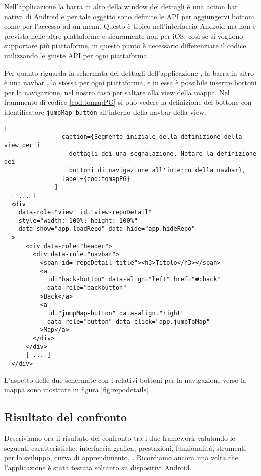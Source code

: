             Nell'applicazione \tisdk{} la barra in alto della window dei
            dettagli è una action bar nativa di Android e per tale oggetto sono
            definite le API per aggiungervi bottoni come per l'accesso ad un
            menù. Questo è tipico nell'interfaccia Android ma non è prevista
            nelle altre piattaforme e sicuramente non per iOS; così se si
            vogliono supportare più piattaforme, in questo punto è necessario
            differenziare il codice utilizzando le giuste API per ogni
            piattaforma.
            
            Per quanto riguarda la schermata dei dettagli dell'applicazione
            \pg{}, la barra in altro è una navbar \kendomob{}, la stessa per
            ogni piattaforma, e in essa è possibile inserire bottoni per la
            navigazione, nel nostro caso per saltare alla view della mappa. Nel
            frammento di codice \ref{cod:tomapPG} si può vedere la definizione
            del bottone con identificatore \texttt{jumpMap-button} all'interno
            della navbar della view.
            \begin{lstlisting}[
                caption={Segmento iniziale della definizione della view per i
                  dettagli dei una segnalazione. Notare la definizione dei
                  bottoni di navigazione all'interno della navbar},
                label={cod:tomapPG}
              ]
  [ ... ]
  <div
    data-role="view" id="view-repoDetail"
    style="width: 100%; height: 100%"
    data-show="app.loadRepo" data-hide="app.hideRepo"
  >
      <div data-role="header">
        <div data-role="navbar">
          <span id="repoDetail-title"><h3>Titolo</h3></span>
          <a
            id="back-button" data-align="left" href="#:back"
            data-role="backbutton"
          >Back</a>
          <a
            id="jumpMap-button" data-align="right"
            data-role="button" data-click="app.jumpToMap"
          >Map</a>
        </div>
      </div>
      [ ... ]
  </div>
            \end{lstlisting}

            L'aspetto delle due schermate con i relativi bottoni per la
            navigazione verso la mappa sono mostrate in figura
            \ref{fig:repodetails}.

	\subsection{Risultato del confronto}
	Descriviamo ora il risultato del confronto tra i due framework valutando 
	le seguenti caratteristiche: interfaccia grafica, prestazioni, 
	funzionalità, strumenti per lo sviluppo, curva di apprendimento, 
	\crossplat{}. Ricordiamo ancora una 
	volta che l'applicazione è stata testata soltanto su dispositivi Android.
